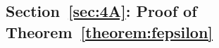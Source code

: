 %
%
%
%
%
%
%
%














\subsection{Section~\ref{sec:4A}: Proof of Theorem~\ref{theorem:fepsilon}}

